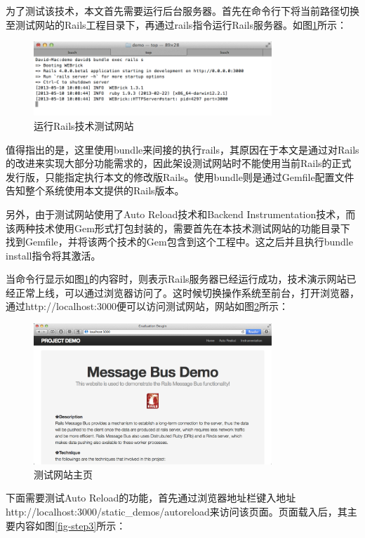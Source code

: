 为了测试该技术，本文首先需要运行后台服务器。首先在命令行下将当前路径切换至测试网站的Rails工程目录下，再通过rails指令运行Rails服务器。如图\ref{fig-step1}所示：

\begin{figure}[h]
\centering
\includegraphics[width=0.8\textwidth]{images/test/1.png}
\caption{运行Rails技术测试网站}
\label{fig-step1}
\end{figure}

值得指出的是，这里使用bundle来间接的执行rails，其原因在于本文是通过对Rails的改进来实现大部分功能需求的，因此架设测试网站时不能使用当前Rails的正式发行版，只能指定执行本文的修改版Rails。使用bundle则是通过Gemfile配置文件告知整个系统使用本文提供的Rails版本。

另外，由于测试网站使用了Auto Reload技术和Backend Instrumentation技术，而该两种技术使用Gem形式打包封装的，需要首先在本技术测试网站的功能目录下找到Gemfile，并将该两个技术的Gem包含到这个工程中。这之后并且执行bundle install指令将其激活。

当命令行显示如图\ref{fig-step1}的内容时，则表示Rails服务器已经运行成功，技术演示网站已经正常上线，可以通过浏览器访问了。这时候切换操作系统至前台，打开浏览器，通过http://localhost:3000便可以访问测试网站，网站如图\ref{fig-step2}所示：

\begin{figure}[h]
\centering
\includegraphics[width=0.8\textwidth]{images/test/2.png}
\caption{测试网站主页}
\label{fig-step2}
\end{figure}

下面需要测试Auto Reload的功能，首先通过浏览器地址栏键入地址http://localhost:3000/static\_demos/autoreload来访问该页面。页面载入后，其主要内容如图\ref{fig-step3}所示：

